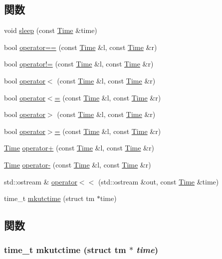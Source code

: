 \subsection*{関数}
\begin{DoxyCompactItemize}
\item 
void \hyperlink{time_8hh_a70619da6bb4db996fece0c1fb1228e34}{sleep} (const \hyperlink{classTime}{Time} \&time)
\item 
bool \hyperlink{time_8hh_a3176ef1cd16508b8339ff1581f967806}{operator==} (const \hyperlink{classTime}{Time} \&l, const \hyperlink{classTime}{Time} \&r)
\item 
bool \hyperlink{time_8hh_a26a6da5d3524e669148b5080788626ee}{operator!=} (const \hyperlink{classTime}{Time} \&l, const \hyperlink{classTime}{Time} \&r)
\item 
bool \hyperlink{time_8hh_ad7758f80ee4f3845218fedfe23091532}{operator$<$} (const \hyperlink{classTime}{Time} \&l, const \hyperlink{classTime}{Time} \&r)
\item 
bool \hyperlink{time_8hh_aed91ae973ee20144a417fb8810e4dc73}{operator$<$=} (const \hyperlink{classTime}{Time} \&l, const \hyperlink{classTime}{Time} \&r)
\item 
bool \hyperlink{time_8hh_a3bf3ca2cebac73aa9ff847cbbe3f8b90}{operator$>$} (const \hyperlink{classTime}{Time} \&l, const \hyperlink{classTime}{Time} \&r)
\item 
bool \hyperlink{time_8hh_a0172fc54dac3024b7291cb7674ccd01f}{operator$>$=} (const \hyperlink{classTime}{Time} \&l, const \hyperlink{classTime}{Time} \&r)
\item 
\hyperlink{classTime}{Time} \hyperlink{time_8hh_a9b60749d49d8826edb60cdbae4d22ed6}{operator+} (const \hyperlink{classTime}{Time} \&l, const \hyperlink{classTime}{Time} \&r)
\item 
\hyperlink{classTime}{Time} \hyperlink{time_8hh_a79263cff29339de9e0808c5f2393b412}{operator-\/} (const \hyperlink{classTime}{Time} \&l, const \hyperlink{classTime}{Time} \&r)
\item 
std::ostream \& \hyperlink{time_8hh_acd440d01c2aaa123d528091ba926ccd3}{operator$<$$<$} (std::ostream \&out, const \hyperlink{classTime}{Time} \&time)
\item 
time\_\-t \hyperlink{time_8hh_a2c5d52bd64c50fccaf8e6bafde034236}{mkutctime} (struct tm $\ast$time)
\end{DoxyCompactItemize}


\subsection{関数}
\hypertarget{time_8hh_a2c5d52bd64c50fccaf8e6bafde034236}{
\subsubsection[{mkutctime}]{\setlength{\rightskip}{0pt plus 5cm}time\_\-t mkutctime (struct tm $\ast$ {\em time})}}
\label{time_8hh_a2c5d52bd64c50fccaf8e6bafde034236}



